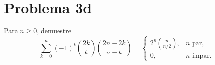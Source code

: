 \section*{Problema 3d}
Para \(n\ge0\), demuestre
\[\sum_{k=0}^n (-1)^k \binom{2k}{k} \binom{2n-2k}{n-k}
  = \begin{cases}
    2^n \binom{n}{n/2}, & n\text{ par},\\
    0, & n\text{ impar}.
  \end{cases}\]
